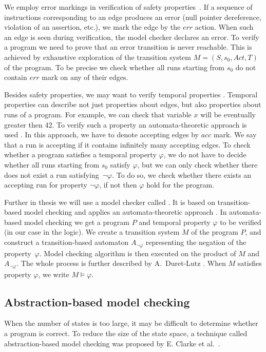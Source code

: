 We employ error markings in verification of safety properties~\cite{Manna92}.  If a
sequence of instructions corresponding to an edge produces an error (null
pointer dereference, violation of an assertion, etc.), we mark the edge by the
$err$ action. When such an edge is seen during verification, the model checker
declares an error. To verify a program we need to prove that an error transition
is never reachable. This is achieved by exhaustive exploration of the transition
system $M = (S, s_0, Act, T)$ of the program. To be precise we check whether all
runs starting from $s_0$ do not contain $err$ mark on any of their edges.

Besides safety properties, we may want to verify temporal properties
\cite{Manna92}. Temporal properties can describe not just properties about
edges, but also properties about runs of a program. For example, we can check
that variable $x$ will be eventually greater then 42. To verify such a property
an automata-theoretic approach is used \cite{Vardi96}. In this approach, we have
to denote accepting edges by $acc$ mark. We say that a run is accepting if it
contains infinitely many accepting edges. To check whether a program satisfies a
temporal property $\varphi$, we do not have to decide whether all runs starting
from $s_0$ satisfy $\varphi$, but we can only check whether there does not exist
a run satisfying~$\neg \varphi$. To do so, we check whether there exists an
accepting run for property $\neg \varphi$, if not then $\varphi$ hold for the
program.

Further in thesis we will use a model checker called \DIVINE. It is based on
transition-based model checking and applies an automata-theoretic approach
\cite{Vardi96}. In automata-based model checking we get a program $P$
and temporal property $\varphi$ to be verified (in our case in the \LTL logic).
We create a transition system $M$ of the program $P$, and construct a
transition-based automaton $A_{\neg \varphi}$ representing the negation of the
property~$\varphi$. Model checking algorithm is then executed on the product of
$M$ and $A_{\neg \varphi}$. The whole process is further described by
A.~Duret-Lutz \cite{Duret04}. When $M$ satisfies property $\varphi$, we write
$M \models \varphi$.

\subsection{Abstraction-based model checking} \label{subsec:amc}

When the number of states is too large, it may be difficult to determine whether a
program is correct. To reduce the size of the state space, a technique called
abstraction-based model checking was proposed by E. Clarke et al.~\cite{Clarke94}.

